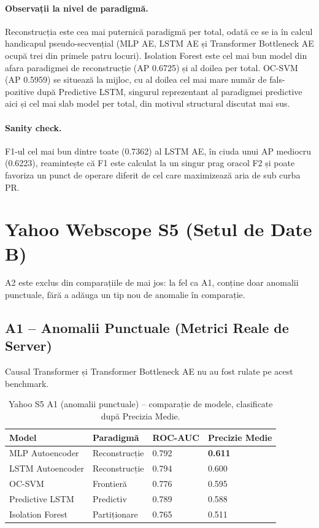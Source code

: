 \paragraph{Observații la nivel de paradigmă.} Reconstrucția este cea mai puternică paradigmă per total, odată ce se ia în calcul handicapul pseudo-secvențial (MLP AE, LSTM AE și Transformer Bottleneck AE ocupă trei din primele patru locuri).
Isolation Forest este cel mai bun model din afara paradigmei de reconstrucție (AP 0.6725) și al doilea per total. OC-SVM (AP 0.5959) se situează la mijloc, cu al doilea cel mai mare număr de fals-pozitive după Predictive LSTM, singurul reprezentant al paradigmei predictive aici și cel mai slab model per total, din motivul structural discutat mai sus.

\paragraph{Sanity check.} F1-ul cel mai bun dintre toate (0.7362) al LSTM AE, în ciuda unui AP mediocru (0.6223), reamintește că F1 este calculat la un singur prag oracol F2 și poate favoriza un punct de operare diferit de cel care maximizează aria de sub curba PR.



\section{Yahoo Webscope S5 (Setul de Date B)}

A2 este exclus din comparațiile de mai jos: la fel ca A1, conține doar anomalii punctuale, fără a adăuga un tip nou de anomalie în comparație.

\subsection{A1 -- Anomalii Punctuale (Metrici Reale de Server)}

Causal Transformer și Transformer Bottleneck AE nu au fost rulate pe acest benchmark.

\begin{table}[h]
\centering
\footnotesize
\begin{tabular}{@{}llll@{}}
\toprule
Model & Paradigmă & ROC-AUC & Precizie Medie \\
\midrule
MLP Autoencoder  & Reconstrucție & 0.792 & \textbf{0.611} \\
LSTM Autoencoder & Reconstrucție & 0.794 & 0.600 \\
OC-SVM           & Frontieră       & 0.776 & 0.595 \\
Predictive LSTM  & Predictiv     & 0.789 & 0.588 \\
Isolation Forest & Partiționare      & 0.765 & 0.511 \\
\bottomrule
\end{tabular}
\caption{Yahoo S5 A1 (anomalii punctuale) -- comparație de modele, clasificate după Precizia Medie.}
\label{tab:yahoo-a1}
\end{table}

